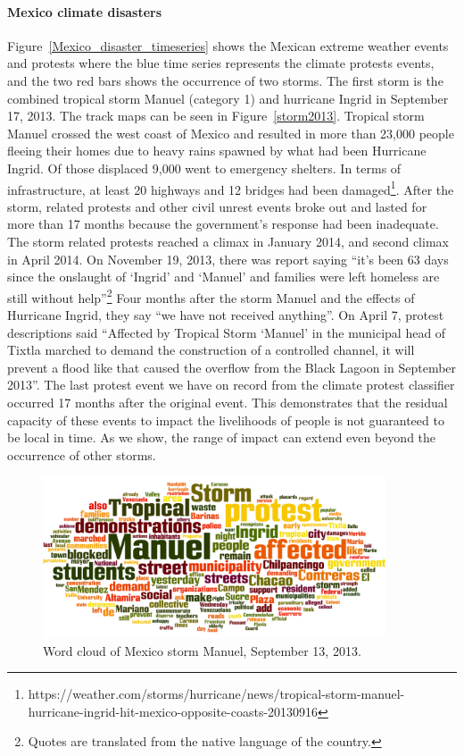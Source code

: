 \paragraph{Mexico climate disasters}
Figure~\ref{Mexico_disaster_timeseries} shows the Mexican extreme weather events and protests where the blue time series represents the climate protests events, and the two red bars shows the occurrence of two storms.
The first storm is the combined tropical storm Manuel (category 1) and hurricane Ingrid in September 17, 2013.
The track maps can be seen in Figure~\ref{storm2013}.
Tropical storm Manuel crossed the west coast of Mexico and resulted in more than 23,000 people fleeing their homes due to heavy rains spawned by what had been Hurricane Ingrid.
Of those displaced 9,000 went to emergency shelters.
In terms of infrastructure, at least 20 highways and 12 bridges had been damaged\footnote{https://weather.com/storms/hurricane/news/tropical-storm-manuel-hurricane-ingrid-hit-mexico-opposite-coasts-20130916}.
After the storm, related protests and other civil unrest events broke out and lasted for more than 17 months because the government's response had been inadequate.
The storm related protests reached a climax in January 2014, and second climax in April 2014.
On November 19, 2013, there was report saying ``it's been 63 days since the onslaught of `Ingrid' and `Manuel' and families were left homeless are still without help''\footnote{Quotes are translated from the native language of the country.}
Four months after the storm Manuel and the effects of Hurricane Ingrid, they say ``we have not received anything''.
On April 7, protest descriptions said ``Affected by Tropical Storm `Manuel' in the municipal head of Tixtla marched to demand the construction of a controlled channel, it will prevent a flood like that caused the overflow from the Black Lagoon in September 2013''.
The last protest event we have on record from the climate protest classifier occurred 17 months after the original event.
This demonstrates that the residual capacity of these events to impact the livelihoods of people is not guaranteed to be local in time.
As we show, the range of impact can extend even beyond the occurrence of other storms.

\begin{figure}[t]
\centerline
{\includegraphics[width=4in]{figures/Mexico_Manuel_wordcloud.png}}
\caption{Word cloud of Mexico storm Manuel, September 13, 2013.}
\label{Manuel_word_cloud}
\end{figure}



